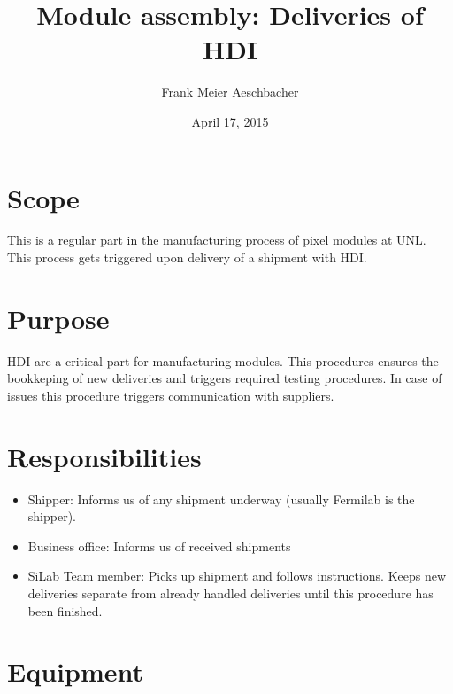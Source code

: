 \documentclass[12pt]{unlsilabsop}
\title{Module assembly: Deliveries of HDI}
\date{April 17, 2015}
\author{Frank Meier Aeschbacher}
\begin{document}
\maketitle

\section{Scope}
This is a regular part in the manufacturing process of pixel modules at UNL. This process gets triggered upon delivery of a shipment with HDI.

\section{Purpose}
HDI are a critical part for manufacturing modules. This procedures ensures the bookkeping of new deliveries and triggers required testing procedures. In case of issues this procedure triggers communication with suppliers.


\section{Responsibilities}

\begin{itemize}
    \item Shipper: Informs us of any shipment underway (usually Fermilab is the shipper).
    \item Business office: Informs us of received shipments
    \item SiLab Team member: Picks up shipment and follows instructions. Keeps new deliveries separate from already handled deliveries until this procedure has been finished.
\end{itemize}

\section{Equipment}
\end{document}

